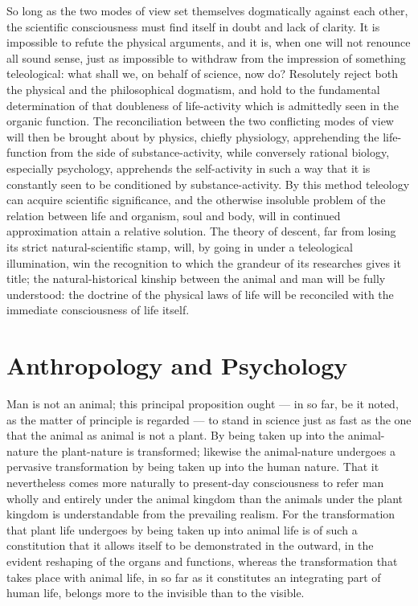 \documentclass[12pt]{book}
\begin{document}
So long as the two modes of view set themselves dogmatically against each other, the
scientific consciousness must find itself in doubt and lack of clarity. It is impossible to
refute the physical arguments, and it is, when one will not renounce all sound sense, just as
impossible to withdraw from the impression of something teleological: what shall we, on
behalf of science, now do? Resolutely reject both the physical and the philosophical
dogmatism, and hold to the fundamental determination of that doubleness of life-activity which
is admittedly seen in the organic function. The reconciliation between the two conflicting
modes of view will then be brought about by physics, chiefly physiology, apprehending the
life-function from the side of substance-activity, while conversely rational biology,
especially psychology, apprehends the self-activity in such a way that it is constantly seen
to be conditioned by substance-activity. By this method teleology can acquire scientific
significance, and the otherwise insoluble problem of the relation between life and organism,
soul and body, will in continued approximation attain a relative solution. The theory of
descent, far from losing its strict natural-scientific stamp, will, by going in under a
teleological illumination, win the recognition to which the grandeur of its researches gives
it title; the natural-historical kinship between the animal and man will be fully understood:
the doctrine of the physical laws of life will be reconciled with the immediate consciousness
of life itself.

\section{Anthropology and Psychology}
\label{sec:20}

\noindent Man is not an animal; this principal proposition ought --- in so far, be it
noted, as the matter of principle is regarded --- to stand in science just as fast as the
one that the animal as animal is not a plant. By being taken up into the animal-nature the
plant-nature is transformed; likewise the animal-nature undergoes a pervasive
transformation by being taken up into the human nature. That it nevertheless comes more
naturally to present-day consciousness to refer man wholly and entirely under the animal
kingdom than the animals under the plant kingdom is understandable from the prevailing
realism. For the transformation that plant life undergoes by being taken up into animal
life is of such a constitution that it allows itself to be demonstrated in the outward, in
the evident reshaping of the organs and functions, whereas the transformation that takes
place with animal life, in so far as it constitutes an integrating part of human life,
belongs more to the invisible than to the visible.
\end{document}
